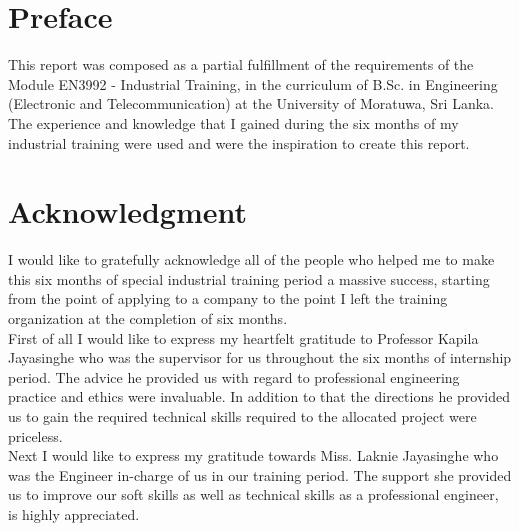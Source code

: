\documentclass[a4paper,12pt]{report}%
\begin{document}



\chapter*{Preface}
This report was composed as a partial fulfillment of the requirements of the Module EN3992 - Industrial Training, in the curriculum of B.Sc. in Engineering (Electronic and Telecommunication) at the University of Moratuwa, Sri Lanka. The experience and knowledge that I gained during the six months of my industrial training were used and were the inspiration to create this report.\\

 

\cleardoublepage



\chapter*{Acknowledgment}

I would like to gratefully acknowledge all of the people who helped me to make this six months of special industrial training period a massive success, starting from the point of applying to a company to the point I left the training organization at the completion of six months.\\

First of all I would like to express my heartfelt gratitude to Professor Kapila Jayasinghe who was the supervisor for us throughout the six months of internship period. The advice he provided us with regard to professional engineering practice and ethics were invaluable. In addition to that the directions he provided us to gain the required technical skills required to the allocated project were priceless.\\

Next I would like to express my gratitude towards Miss. Laknie Jayasinghe who was the Engineer in-charge of us in our training period. The support she provided us to improve our soft skills as  well as technical  skills as a professional engineer, is highly appreciated.


\end{document}

